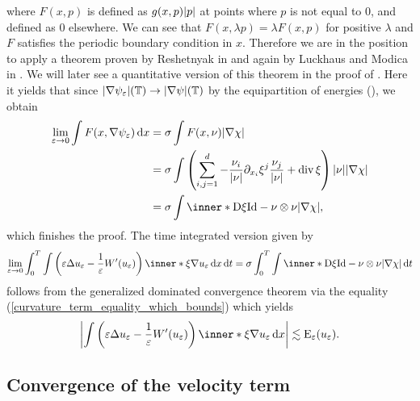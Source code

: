 where $ F ( x, p ) $ is defined as $ g ( x , p ) \abs{ p } $ at points where $ 
p $ is
not equal to 0, and defined as 0 elsewhere. 
We can see that $ F (x , \lambda p ) = 
\lambda F ( x, p ) $ for positive $ \lambda $ and $ F $ satisfies the 
periodic boundary condition in $ x $.
Therefore we are in the position to apply a 
theorem proven by Reshetnyak in \cite{Reshetnyak_weak_convergence} and again by 
Luckhaus and Modica in \cite{luckhaus_modica_gibbs_thompson_relation}. We 
will later see a quantitative version of this theorem in the proof of
. 
Here it yields that since $ \abs{ \nabla \psi_{ 
\varepsilon  } } ( \operatorname{\mathbb{T}} ) \to \abs{ \nabla \psi } ( \operatorname{\mathbb{T}} ) $ by the 
equipartition of energies (), we obtain
\begin{align*}
	\lim_{ \varepsilon \to 0 }
	\int
	F ( x, \nabla \psi_{ \varepsilon } )
	\dd{ x }
	& =
	\sigma
	\int
	F ( x , \nu )
	\abs{ \nabla \chi }
	\\
	& = 
	\sigma
	\int
	\left(
	\sum_{ i, j = 1}^{ d }
	-
	\frac{ \nu_{ i } }{ \abs{ \nu } }
	\partial_{ x_{ i } } \xi^{ j }
	\frac{ \nu_{ j } }{ \abs{ \nu } }
	+
	\divg \xi 
	\right)
	\abs{ \nu }
	\abs{ \nabla \chi }
	\\
	& =
	\sigma
	\int
	\inner*{ \diff \xi }{ \mathrm{Id} - \nu \otimes \nu }
	\abs{ \nabla \chi },
\end{align*}
which finishes the proof.
The time integrated version given by
\begin{equation*}
	\lim_{ \varepsilon \to 0 }
	\int_{ 0 }^{ T }
	\int
	\left(
	\varepsilon \Delta u_{ \varepsilon }
	- 
	\frac{ 1 }{ \varepsilon }
	W'( u_{ \varepsilon } )
	\right)
	\inner*{ \xi }{ \nabla u_{ \varepsilon } }
	\dd{ x }
	\dd{ t }
	=
	\sigma
	\int_{ 0 }^{ T }
	\int
	\inner*{ \diff \xi }{ \mathrm{Id} - \nu \otimes \nu }
	\abs{ \nabla \chi }
	\dd{ t }
\end{equation*} 
follows from the generalized dominated convergence theorem via the equality 
(\ref{curvature_term_equality_which_bounds}) which yields
\begin{equation*}
	\abs{
		\int
		\left(
		\varepsilon \Delta u_{ \varepsilon } 
		-
		\frac{ 1 }{ \varepsilon }
		W'( u_{ \varepsilon } )
		\right)
		\inner*{ \xi } { \nabla u_{ \varepsilon } }
		\dd{ x }
	}
	\lesssim
	\energy_{ \varepsilon } ( u_{ \varepsilon } ).
\end{equation*}


\subsection{Convergence of the velocity term}

